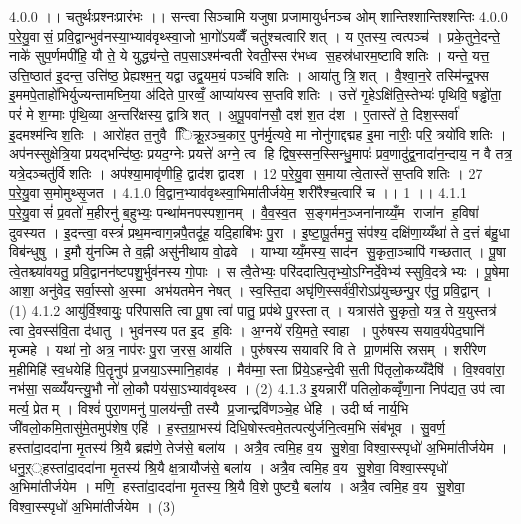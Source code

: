 4.0.0
।। चतुर्थःप्रश्नःप्रारंभः ।। सन्त्वा सिञ्चामि यजुषा प्रजामायुर्धनञ्च ओम् शान्तिश्शान्तिश्शन्तिः
4.0.0
प॒रे॒यु॒वासं॒ प्रवि॒द्वान्भुव॑नस्या॒भ्याव॑वृथ्स्वा॒जो भा॒गो॑ऽयव्वैँ चतु॑श्चत्वारिशत् । य ए॒तस्य॒ त्वत्पञ्च॑ । प्रके॒तुने॒दन्ते॒ नाके॑ सुप॒र्णमपी॑हि॒ यौ ते॒ ये युद्ध्य॑न्ते॒ तप॒साऽश्म॑न्वती रेवती॒स्सर॑भध्व स॒हस्र॑धारम॒ष्टावि॑शतिः । यन्ते॒ यत्त॒ उत्ति॒ष्ठात॑ इ॒दन्त॒ उत्ति॑ष्ठ॒ प्रेह्यश्म॒न्॒ यद्वा उद्व॒यम॒यं पञ्च॑विशतिः । आया॑तु त्रि॒॒शत् । वै॒श्वा॒न॒रे तस्मि॑न्द्र॒फ्स इ॒ममपे॒ताहो॑भिर्युज्यन्तामघ्नि॒या अ॑दिते पा॒रव्वँ॒ आप्या॑यस्व स॒प्तवि॑शतिः । उत्ते॑ गृ॒हेऽक्षि॑ति॒स्तेभ्यः॑ पृथिवि॒ षड्ढो॑ता॒ परं॑ मे श॒ग्माः पृ॑थि॒व्या अ॒न्तरि॑क्षस्य॒ द्वात्रि॑शत् । अ॒पू॒पवा॑नसौ॒ दश॑ श॒त द॑श । ए॒तास्ते॑ ते॒ दिश॒स्सर्वा॑ इ॒दमश्म॑न्विश॒तिः । आरो॑हत त॒नुवै ििक्रू॒ऱञ्च॒कार॒ पुन॑र्मृ॒त्यवे॒ मा नोनु॑गाद्दद्मह इ॒मा नारीः॒ परि॒ त्रयो॑विशतिः । अप॑नस्सुक्षेत्रि॒या प्रयद्भन्दि॑ष्ठः॒ प्रयद॒ग्नेः प्रयत्ते॑ अग्ने॒ त्व हि द्विष॒स्सन॒स्सिन्धु॒मापः॑ प्रव॒णादु॑द्व॒नादा॑न॒न्दाय॒ न वै तत्र॒ यत्रे॒दञ्चतु॑र्विशतिः । अप॑श्या॒मावृ॑णीहि॒ द्वाद॑श द्वादश । 12 प॒रे॒यु॒वास॒मायात्वे॒तास्ते॑ स॒प्तवि॑शतिः । 27 प॒रे॒यु॒वास॒मोमुथ्सृ॒जत ।
4.1.0
वि॒द्वान॒भ्याव॑वृथ्स्वा॒भिमा॑तीर्जयेम॒ शरी॑रैश्च॒त्वारि॑ च ।। 1 ।।
4.1.1
प॒रे॒यु॒वासं॑ प्र॒वतो॑ म॒हीरनु॑ ब॒हुभ्यः॒ पन्था॑मनपस्पशा॒नम् । वै॒व॒स्व॒त स॒ङ्गम॑न॒ञ्जना॑नाय्यँ॒म राजा॑न ह॒विषा॑ दुवस्यत । इ॒दन्त्वा॒ वस्त्रं॑ प्रथ॒मन्वाग॒न्नपै॒तदू॑ह॒ यदि॒हाबि॑भः पु॒रा । इ॒ष्टा॒पू॒र्तमनु॒ संप॑श्य॒ दक्षि॑णा॒य्यँथा॑ ते द॒त्तं ब॑हु॒धा विब॑न्धुषु । इ॒मौ यु॑नज्मि ते व॒ह्नी असु॑नीथाय वो॒ढवे । याभ्याय्यँ॒मस्य॒ साद॑न सु॒कृता॒ञ्चापि॑ गच्छतात् । पू॒षा त्वे॒तश्च्या॑वयतु॒ प्रवि॒द्वानन॑ष्टपशु॒र्भुव॑नस्य गो॒पाः । स त्वै॒तेभ्यः॒ परि॑ददात्पि॒तृभ्यो॒ऽग्निर्दे॒वेभ्य॑ स्सुवि॒दत्रेभ्यः । पू॒षेमा आशा॒ अनु॑वेद॒ सर्वा॒स्सो अ॒स्मा अभ॑यतमेन नेषत् । स्व॒स्ति॒दा अघृ॑णि॒स्सर्व॑वी॒रोऽप्र॑युच्छन्पु॒र ए॑तु॒ प्रवि॒द्वान् । (1)
4.1.2
आयु॑र्वि॒श्वायुः॒ परि॑पासति त्वा पू॒षा त्वा॑ पातु॒ प्रप॑थे पु॒रस्तात् । यत्रास॑ते सु॒कृतो॒ यत्र॒ ते य॒युस्तत्र॑ त्वा दे॒वस्स॑वि॒ता द॑धातु । भुव॑नस्य पत इ॒द ह॒विः । अ॒ग्नये॑ रयि॒मते॒ स्वाहा । पुरु॑षस्य सयाव॒र्यपेद॒घानि॑ मृज्महे । यथा॑ नो॒ अत्र॒ नाप॑रः पु॒रा ज॒रस॒ आय॑ति । पुरु॑षस्य सयावरि वि ते प्रा॒णम॑सि स्रसम् । शरी॑रेण म॒हीमिहि॑ स्व॒धयेहि॑ पि॒तॄनुप॑ प्र॒जया॒ऽस्मानि॒हाव॑ह । मैव॑म्मा॒स्ता प्रि॑ये॒ऽहन्दे॒वी स॒ती पि॑तृलो॒कय्यँदैषि॑ । वि॒श्ववा॑रा॒ नभ॑सा॒ सव्व्यँ॑यन्त्यु॒भौ नो॑ लो॒कौ पय॑सा॒ऽभ्याव॑वृथ्स्व । (2)
4.1.3
इ॒यन्नारी॑ पतिलो॒कव्वृँणा॒ना निप॑द्यत॒ उप॑ त्वा मर्त्य॒ प्रेतम् । विश्वं॑ पुरा॒णमनु॑ पा॒लय॑न्ती॒ तस्यै प्र॒जान्द्रवि॑णञ्चे॒ह धे॑हि । उदीर्ष्व नार्य॒भि जी॑वलो॒कमि॒तासु॑मे॒तमुप॑शेष॒ एहि॑ । ह॒स्त॒ग्रा॒भस्य॑ दिधि॒षोस्त्वमे॒तत्पत्यु॑र्जनि॒त्वम॒भि संब॑भूव । सु॒वर्ण॒॒ हस्ता॑दा॒ददा॑ना मृ॒तस्य॑ श्रि॒यै ब्रह्म॑णे॒ तेज॑से॒ बला॑य । अत्रै॒व त्वमि॒ह व॒य सु॒शेवा॒ विश्वा॒स्स्पृधो॑ अ॒भिमा॑तीर्जयेम । धनु॒ऱ््हस्ता॑दा॒ददा॑ना मृ॒तस्य॑ श्रि॒यै क्ष॒त्रायौज॑से॒ बला॑य । अत्रै॒व त्वमि॒ह व॒य सु॒शेवा॒ विश्वा॒स्स्पृधो॑ अ॒भिमा॑तीर्जयेम । मणि॒॒ हस्ता॑दा॒ददा॑ना मृ॒तस्य॒ श्रि॒यै वि॒शे पुष्ट्यै॒ बला॑य । अत्रै॒व त्वमि॒ह व॒य सु॒शेवा॒ विश्वा॒स्स्पृधो॑ अ॒भिमा॑तीर्जयेम । (3)
